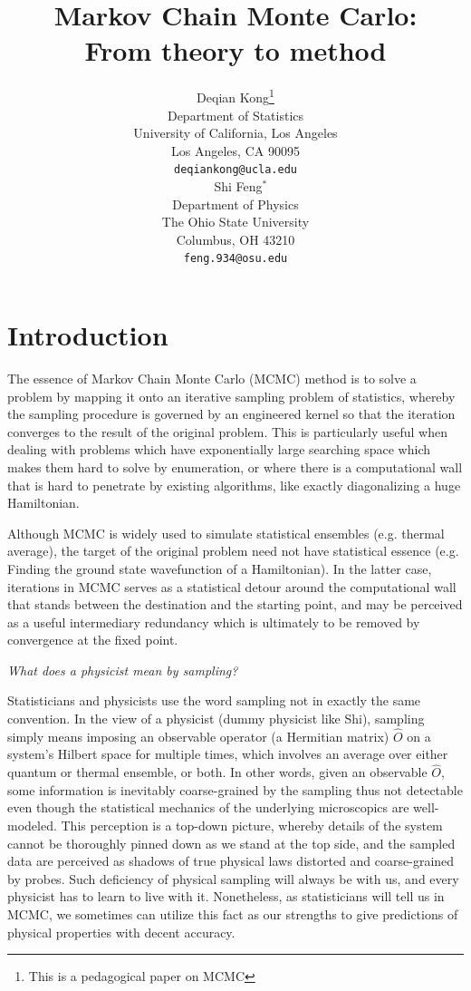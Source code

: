 \documentclass{article}
\title{Markov Chain Monte Carlo:\\
From theory to method}
\author{
  Deqian Kong\thanks{This is a pedagogical paper on MCMC} \\
  Department of Statistics\\
  University of California, Los Angeles\\
  Los Angeles, CA 90095 \\
  \texttt{deqiankong@ucla.edu} \\
\
    \And
  Shi Feng$^*$ \\
  Department of Physics\\
  The Ohio State University\\
  Columbus, OH 43210 \\
  \texttt{feng.934@osu.edu} \\
  
}
\begin{document}
\maketitle

\section{Introduction}
The essence of Markov Chain Monte Carlo (MCMC) method is to solve a problem by mapping it onto an iterative sampling problem of statistics, whereby the sampling procedure is governed by an engineered kernel so that the iteration converges to the result of the original problem. This is particularly useful when dealing with problems which have exponentially large searching space which makes them hard to solve by enumeration, or where there is a computational wall that is hard to penetrate by existing algorithms, like exactly diagonalizing a huge Hamiltonian.   

Although MCMC is widely used to simulate statistical ensembles (e.g. thermal average), the target of the original problem need not have statistical essence (e.g. Finding the ground state wavefunction of a Hamiltonian). In the latter case, iterations in MCMC serves as a statistical detour around the computational wall that stands between the destination and the starting point, and may be perceived as a useful intermediary redundancy which is ultimately to be removed by convergence at the fixed point.




\bigskip

\textit{What does a physicist mean by \emph{sampling}?}

Statisticians and physicists use the word sampling not in exactly the same convention. In the view of a physicist (dummy physicist like Shi), sampling simply means imposing an observable operator (a Hermitian matrix) $\hat{O}$ on a system's Hilbert space for multiple times, which involves an average over either quantum or thermal ensemble, or both. In other words, given an observable $\hat{O}$, some information is inevitably coarse-grained by the sampling thus not detectable even though the statistical mechanics of the underlying microscopics are well-modeled. This perception is a top-down picture, whereby details of the system cannot be thoroughly pinned down as we stand at the top side, and the sampled data are perceived as shadows of true physical laws distorted and coarse-grained by probes. Such deficiency of physical sampling will always be with us, and every physicist has to learn to live with it. Nonetheless, as statisticians will tell us in MCMC, we sometimes can utilize this fact as our strengths to give predictions of physical properties with decent accuracy. 
\end{document}
